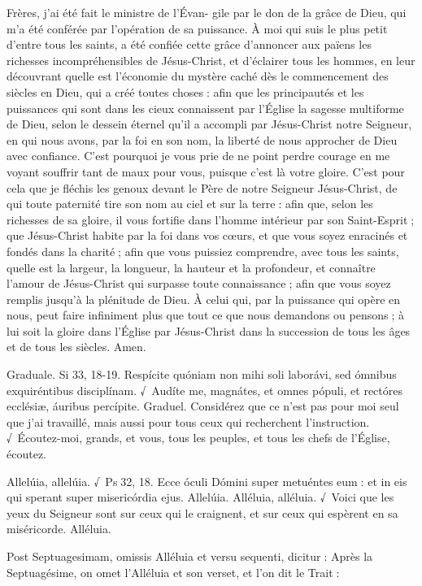 \begin{paracol}{2}
Frères, j’ai été fait le ministre de l’Évan- gile par le don de la grâce de Dieu, qui m’a été conférée par l’opération de sa puissance. À moi qui suis le plus petit d’entre tous les saints, a été confiée cette grâce d’annoncer aux païens les richesses incompréhensibles de Jésus-Christ, et d’éclairer tous les hommes, en leur découvrant quelle est l’économie du mystère caché dès le commencement des siècles en Dieu, qui a créé toutes choses : afin que les principautés et les puissances qui sont dans les cieux connaissent par l’Église la sagesse multiforme de Dieu, selon le dessein éternel qu’il a accompli par Jésus-Christ notre Seigneur, en qui nous avons, par la foi en son nom, la liberté de nous approcher de Dieu avec confiance. C’est pourquoi je vous prie de ne point perdre courage en me voyant souffrir tant de maux pour vous, puisque c’est là votre gloire. C’est pour cela que je fléchis les genoux devant le Père de notre Seigneur Jésus-Christ, de qui toute paternité tire son nom au ciel et sur la terre : afin que, selon les richesses de sa gloire, il vous fortifie dans l’homme intérieur par son Saint-Esprit ; que Jésus-Christ habite par la foi dans vos cœurs, et que vous soyez enracinés et fondés dans la charité ; afin que vous puissiez comprendre, avec tous les saints, quelle est la largeur, la longueur, la hauteur et la profondeur, et connaître l’amour de Jésus-Christ qui surpasse toute connaissance ; afin que vous soyez remplis jusqu’à la plénitude de Dieu. À celui qui, par la puissance qui opère en nous, peut faire infiniment plus que tout ce que nous demandons ou pensons ; à lui soit la gloire dans l’Église par Jésus-Christ dans la succession de tous les âges et de tous les siècles. Amen.
\switchcolumn*

Graduale. Si 33, 18-19. Respícite quóniam non mihi soli laborávi, sed ómnibus exquiréntibus disciplínam. √~Audíte me, magnátes, et omnes pópuli, et rectóres ecclésiæ, áuribus percípite.
\switchcolumn
Graduel. Considérez que ce n’est pas pour moi seul que j’ai travaillé, mais aussi pour tous ceux qui recherchent l’instruction. √~Écoutez-moi, grands, et vous, tous les peuples, et tous les chefs de l’Église, écoutez.
\switchcolumn*

Allelúia, allelúia. √~Ps 32, 18. Ecce óculi Dómini super metuéntes eum : et in eis qui sperant super misericórdia ejus. Allelúia.
\switchcolumn
Alléluia, alléluia. √~Voici que les yeux du Seigneur sont sur ceux qui le craignent, et sur ceux qui espèrent en sa miséricorde. Alléluia.
\switchcolumn*

Post Septuagesimam, omissis Alléluia et versu sequenti, dicitur :
\switchcolumn
Après la Septuagésime, on omet l’Alléluia et son verset, et l’on dit le Trait :
\switchcolumn*


\end{paracol}
